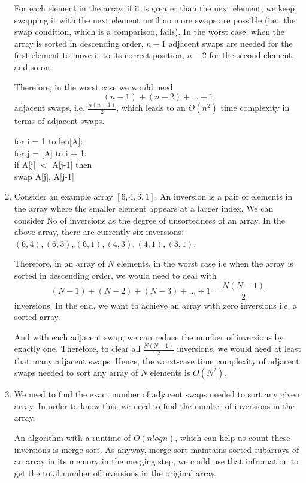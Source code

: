 \documentclass{article}[12pt]
\begin{document}
\begin{enumerate}
For each element in the array, if it is greater than the next element, we keep swapping it with the next element until no more swaps are possible (i.e., the swap condition, which is a comparison, fails). In the worst case, when the array is sorted in descending order, $n-1$ adjacent swaps are needed for the first element to move it to its correct position, $n-2$ for the second element, and so on.

Therefore, in the worst case we would need 
\[
(n-1) + (n-2) + \dots + 1 
\] adjacent swaps, i.e. $\frac{n(n-1)}{2}$, which leads to an $O(n^2)$ time complexity in terms of adjacent swaps.

for i = 1 to len[A]:\\
\hspace*{1em} for j = [A] to i + 1:\\
\hspace*{2em} if A[j] $<$ A[j-1] then\\
\hspace*{3em} swap A[j], A[j-1]

\item 
Consider an example array $[6, 4, 3, 1]$.
An {inversion} is a pair of elements in the array where the smaller element appears at a larger index. 
We can consider No of inversions as the degree of unsortedness of an array. 
In the above array, there are currently six inversions: $(6,4), (6,3), (6,1), (4,3), (4,1), (3,1)$.

Therefore, in an array of $N$ elements, in the worst case i.e when the array is sorted in descending order, 
we would need to deal with
\[
(N - 1) + (N - 2) + (N - 3) + \dots + 1 = \frac{N(N-1)}{2}
\]
inversions. In the end, we want to achieve an array with zero inversions i.e. a sorted array.

And with each adjacent swap, we can reduce the number of inversions by exactly one. 
Therefore, to clear all $\frac{N(N-1)}{2}$ inversions, we would need at  least that many adjacent swaps. Hence, the worst-case time complexity of adjacent swaps needed to sort any array of $N$ elements is $O(N^2)$. 

\item 
We need to find the exact number of adjacent swaps needed to sort any given array. In order to know this, we need to find the number of inversions in the array.

An algorithm with a runtime of $O(nlogn)$, which can help us count these inversions is merge sort. As anyway, merge sort maintains sorted subarrays of an array in its memory in the merging step, we could use that infromation to get the total number of inversions in the original array. 


\end{enumerate}
\end{document}
